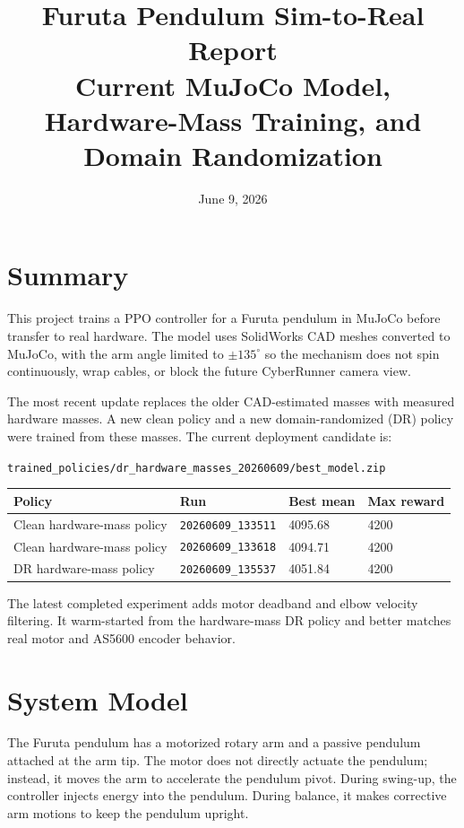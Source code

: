\documentclass[11pt,a4paper]{article}
\title{\vspace{-1.2cm}\textbf{Furuta Pendulum Sim-to-Real Report}\\
\large Current MuJoCo Model, Hardware-Mass Training, and Domain Randomization}
\author{}
\date{June 9, 2026}
\begin{document}
\maketitle
\vspace{-1.0cm}

\section{Summary}

This project trains a PPO controller for a Furuta pendulum in MuJoCo before
transfer to real hardware.  The model uses SolidWorks CAD meshes converted to
MuJoCo, with the arm angle limited to $\pm135^\circ$ so the mechanism does not
spin continuously, wrap cables, or block the future CyberRunner camera view.

The most recent update replaces the older CAD-estimated masses with measured
hardware masses.  A new clean policy and a new domain-randomized (DR) policy
were trained from these masses.  The current deployment candidate is:

\begin{center}
\texttt{trained\_policies/dr\_hardware\_masses\_20260609/best\_model.zip}
\end{center}

\begin{center}
\begin{tabular}{llll}
\toprule
\textbf{Policy} & \textbf{Run} & \textbf{Best mean} & \textbf{Max reward} \\
\midrule
Clean hardware-mass policy & \texttt{20260609\_133511} & 4095.68 & 4200 \\
Clean hardware-mass policy & \texttt{20260609\_133618} & 4094.71 & 4200 \\
DR hardware-mass policy & \texttt{20260609\_135537} & 4051.84 & 4200 \\
\bottomrule
\end{tabular}
\end{center}

The latest completed experiment adds motor deadband and elbow velocity
filtering.  It warm-started from the hardware-mass DR policy and better matches
real motor and AS5600 encoder behavior.

\section{System Model}

The Furuta pendulum has a motorized rotary arm and a passive pendulum attached
at the arm tip.  The motor does not directly actuate the pendulum; instead, it
moves the arm to accelerate the pendulum pivot.  During swing-up, the controller
injects energy into the pendulum.  During balance, it makes corrective arm
motions to keep the pendulum upright.
\end{document}
